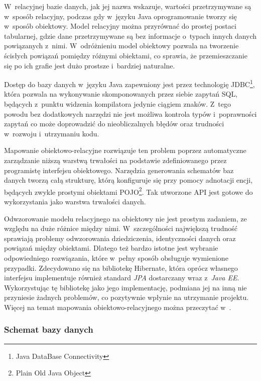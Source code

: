 \documentclass[11pt]{aghdpl}
\begin{document}
W~relacyjnej bazie danych, jak jej nazwa wskazuje, wartości przetrzymywane są w~sposób relacyjny, podczas gdy w~języku Java oprogramowanie tworzy się w~sposób obiektowy. Model relacyjny można przyrównać do prostej postaci tabularnej, gdzie dane przetrzymywane są bez informacje o~typach innych danych powiązanych z~nimi. W~odróżnieniu model obiektowy pozwala na tworzenie ścisłych powiązań pomiędzy różnymi obiektami, co sprawia, że przemieszczanie się po ich grafie jest dużo prostsze i~bardziej naturalne.

Dostęp do bazy danych w~języku Java zapewniony jest przez technologię JDBC\footnote{Java DataBase Connectivity}, która pozwala na wykonywanie skomponowanych przez siebie zapytań SQL, będących z~punktu widzenia kompilatora jedynie ciągiem znaków. Z~tego powodu bez dodatkowych narzędzi nie jest możliwa kontrola typów i~poprawności zapytań co może doprowadzić do nieobliczalnych błędów oraz trudności w~rozwoju i~utrzymaniu kodu.

Mapowanie obiektowo-relacyjne rozwiązuje ten problem poprzez automatyczne zarządzanie niższą warstwą trwałości na podstawie zdefiniowanego przez programistę interfejsu obiektowego. Narzędzia generowania schematów baz danych tworzą całą strukturę, którą konfiguruje się przy pomocy adnotacji encji, będących zwykle prostymi obiektami POJO\footnote{Plain Old Java Object}. Tak utworzone API jest gotowe do wykorzystania jako warstwa trwałości danych.

Odwzorowanie modelu relacyjnego na obiektowy nie jest prostym zadaniem, ze względu na duże różnice między nimi. W~szczególności największą trudność sprawiają problemy odwzorowania dziedziczenia, identyczności danych oraz powiązań między obiektami. Dlatego też bardzo istotne jest wybranie odpowiedniego rozwiązania, które w~pełny sposób obsługuje wymienione przypadki. Zdecydowano się na bibliotekę Hibernate, która oprócz własnego interfejsu implementuje również standard \emph{JPA} dostarczany wraz z~\emph{Java EE}. Wykorzystując tę bibliotekę jako jego implementację, podmiana jej na inną nie przyniesie żadnych problemów, co pozytywnie wpłynie na utrzymanie projektu. Więcej na temat mapowania obiektowo-relacyjnego można przeczytać w~\cite{HORM}.

\subsubsection{Schemat bazy danych}
\end{document}
